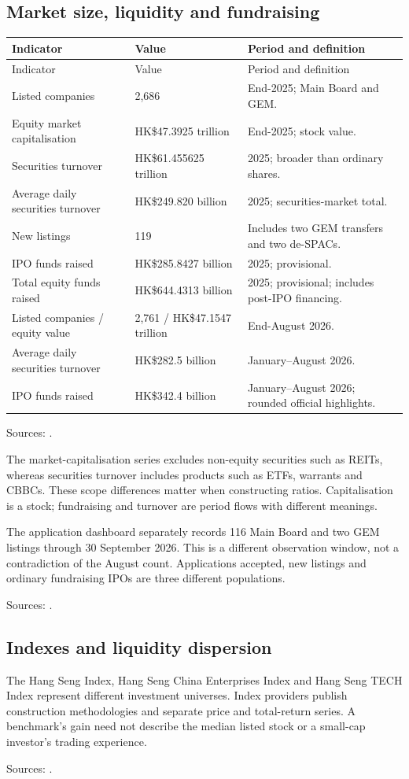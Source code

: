 \documentclass[11pt,a4paper]{article}
\newcommand{\source}[1]{\par{\footnotesize\color{ink}Sources: \cite{#1}.}\par}
\begin{document}
\subsection{Market size, liquidity and fundraising}
\begin{longtable}{@{}L{6.4cm}L{3.9cm}L{5.2cm}@{}}
\toprule Indicator & Value & Period and definition\\\midrule\endfirsthead
\toprule Indicator & Value & Period and definition\\\midrule\endhead
Listed companies & 2,686 & End-2025; Main Board and GEM.\\
Equity market capitalisation & HK\$47.3925 trillion & End-2025; stock value.\\
Securities turnover & HK\$61.455625 trillion & 2025; broader than ordinary shares.\\
Average daily securities turnover & HK\$249.820 billion & 2025; securities-market total.\\
New listings & 119 & Includes two GEM transfers and two de-SPACs.\\
IPO funds raised & HK\$285.8427 billion & 2025; provisional.\\
Total equity funds raised & HK\$644.4313 billion & 2025; provisional; includes post-IPO financing.\\
Listed companies / equity value & 2,761 / HK\$47.1547 trillion & End-August 2026.\\
Average daily securities turnover & HK\$282.5 billion & January--August 2026.\\
IPO funds raised & HK\$342.4 billion & January--August 2026; rounded official highlights.\\
\bottomrule
\end{longtable}
\source{hkstats,hkmonthly}
The market-capitalisation series excludes non-equity securities such as REITs, whereas securities turnover includes products such as ETFs, warrants and CBBCs. These scope differences matter when constructing ratios. Capitalisation is a stock; fundraising and turnover are period flows with different meanings.

The application dashboard separately records 116 Main Board and two GEM listings through 30 September 2026. This is a different observation window, not a contradiction of the August count. Applications accepted, new listings and ordinary fundraising IPOs are three different populations.\source{eligibility}

\subsection{Indexes and liquidity dispersion}
The Hang Seng Index, Hang Seng China Enterprises Index and Hang Seng TECH Index represent different investment universes. Index providers publish construction methodologies and separate price and total-return series. A benchmark's gain need not describe the median listed stock or a small-cap investor's trading experience.\source{hsi}
\end{document}
